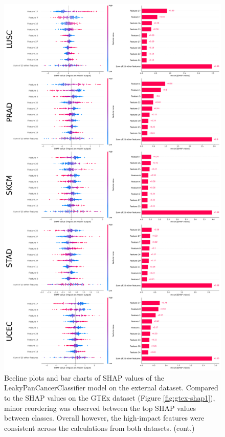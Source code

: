 \documentclass{l4proj}
\begin{document}
\begin{appendices}
\begin{figure}\ContinuedFloat
    \centering
    \includegraphics[width=0.85\linewidth]{images/ext_shap2.png}
    \caption{Beeline plots and bar charts of SHAP values of the LeakyPanCancerClassifier model on the external dataset. Compared to the SHAP values on the GTEx dataset (Figure \ref{fig:gtex-shap1}), minor reordering was observed between the top SHAP values between classes. Overall however, the high-impact features were consistent across the calculations from both datasets. (cont.)}
    \label{fig:ext-shap2}
\end{figure}


\end{appendices}
\end{document}
